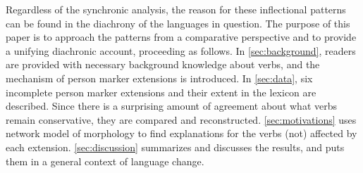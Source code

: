 Regardless of the synchronic analysis, the reason for these inflectional patterns can be found in the diachrony of the languages in question.
The purpose of this paper is to approach the patterns from a comparative perspective and to provide a unifying diachronic account, proceeding as follows.
In \cref{sec:background}, readers are provided with necessary background knowledge about \PC verbs, and the mechanism of person marker extensions is introduced.
In \cref{sec:data}, six incomplete person marker extensions and their extent in the lexicon are described.
Since there is a surprising amount of agreement about what verbs remain conservative, they are compared and reconstructed.
\cref{sec:motivations} uses  network model of morphology to find explanations for the verbs (not) affected by each extension.
\cref{sec:discussion} summarizes and discusses the results, and puts them in a general context of language change.

